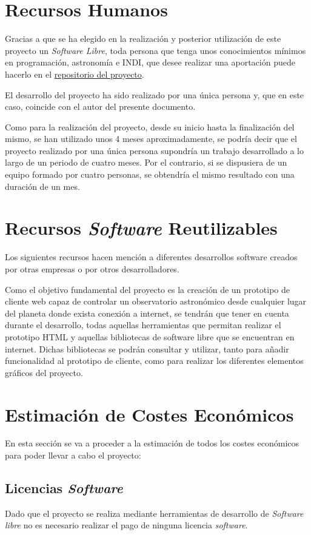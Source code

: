 \section{Recursos Humanos}
Gracias a que se ha elegido en la realización y posterior utilización de este proyecto un \textit{Software Libre}, toda persona que tenga unos conocimientos mínimos en programación, astronomía e INDI, que desee realizar una aportación puede hacerlo en el \href{https://github.com/PabloTorrecillas/IndiWebClient}{repositorio del proyecto}.

El desarrollo del proyecto ha sido realizado por una única persona y, que en este caso, coincide con el autor del presente documento.

Como para la realización del proyecto, desde su inicio hasta la finalización del mismo, se han utilizado unos 4 meses aproximadamente, se podría decir que el proyecto realizado por una única persona supondría un trabajo desarrollado a lo largo de un periodo de cuatro meses. Por el contrario, si se dispusiera de un equipo formado por cuatro personas, se obtendría el mismo resultado con una duración de un mes.

\section{Recursos \textit{Software} Reutilizables}
Los siguientes recursos hacen mención a diferentes desarrollos software creados por otras empresas o por otros desarrolladores.

Como el objetivo fundamental del proyecto es la creación de un prototipo de cliente web capaz de controlar un observatorio astronómico desde cualquier lugar del planeta donde exista conexión a internet, se tendrán que tener en cuenta durante el desarrollo, todas aquellas herramientas que permitan realizar el prototipo HTML y aquellas bibliotecas de software libre que se encuentran en internet. Dichas bibliotecas se podrán consultar y utilizar, tanto para añadir funcionalidad al prototipo de cliente, como para realizar los diferentes elementos gráficos del proyecto.

\section{Estimación de Costes Económicos}
En esta sección se va a proceder a la estimación de todos los costes económicos para poder llevar a cabo el proyecto:

\subsection{Licencias \textit{Software}}
Dado que el proyecto se realiza mediante herramientas de desarrollo de \textit{Software libre} no es necesario realizar el pago de ninguna licencia \textit{software}.

